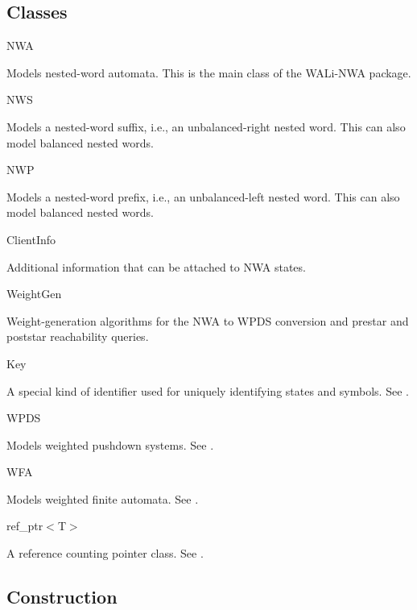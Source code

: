 \documentclass{llncs}
\begin{document}
\subsection{Classes}
\label{Se:Classes}

\begin{description}

\item NWA \nopagebreak

  Models nested-word automata.  This is the main class of the WALi-NWA package.

\item NWS \nopagebreak

  Models a nested-word suffix, i.e., an unbalanced-right nested word.  This
  can also model balanced nested words.

\item NWP \nopagebreak

  Models a nested-word prefix, i.e., an unbalanced-left nested word.  This
  can also model balanced nested words.

\item ClientInfo \nopagebreak

  Additional information that can be attached to NWA states.

\item WeightGen \nopagebreak

  Weight-generation algorithms for the NWA to WPDS conversion and prestar and
  poststar reachability queries.

\item Key \nopagebreak

  A special kind of identifier used for uniquely identifying states and
  symbols.  See \cite{wali}.

\item WPDS \nopagebreak

  Models weighted pushdown systems.  See \cite{wali}.

\item WFA \nopagebreak

  Models weighted finite automata.  See \cite{wali}.

\item ref\_ptr$<$T$>$ \nopagebreak

  A reference counting pointer class.  See \cite{wali}. \\

\end{description}


\subsection{Construction}
\label{Se:Construction}
\end{document}
